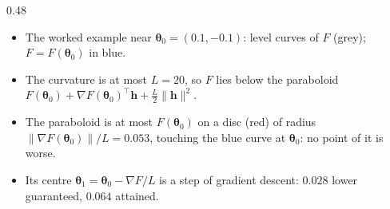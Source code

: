 \documentclass[handoutsbeamer.tex]{subfiles}
\begin{document}
\begin{frame}
{\begin{columns}[c]
\begin{column}{0.48\textwidth}\footnotesize\begin{itemize}\setlength\itemsep{0.3em}
    \item The worked example near $\boldsymbol\theta_0 = (0.1,-0.1)$: level curves of $F$ (grey); $F = F(\boldsymbol\theta_0)$ in blue.
    \item The curvature is at most $L = 20$, so $F$ lies below the paraboloid $F(\boldsymbol\theta_0)+\nabla F(\boldsymbol\theta_0)^\top\boldsymbol h+\frac L2\|\boldsymbol h\|^2$.
    \item The paraboloid is at most $F(\boldsymbol\theta_0)$ on a disc (red) of radius $\|\nabla F(\boldsymbol\theta_0)\|/L = 0.053$, touching the blue curve at $\boldsymbol\theta_0$: no point of it is worse.
    \item Its centre $\boldsymbol\theta_1 = \boldsymbol\theta_0-\nabla F/L$ is a step of gradient descent: $0.028$ lower guaranteed, $0.064$ attained.
\end{itemize}\end{column}\end{columns}}
\end{frame}
\end{document}
